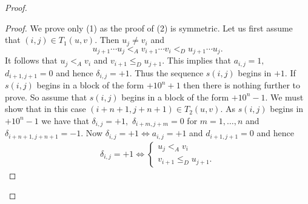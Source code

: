 \documentclass[12pt,a4paper]{amsart}
\begin{document}
\begin{proof}
\begin{proof} We prove only (1) as the proof of (2) is symmetric. Let us first assume that $(i,j)\in T_1(u,v).$ Then  $u_j\neq v_i$ and \begin{equation}\label{eq1}u_{j+1}\cdots u_j<_A v_{i+1}\cdots v_i <_D u_{j+1}\cdots u_j.\end{equation}
It follows that $u_j<_A v_i$ and $v_{i+1}\leq _D u_{j+1}.$ This implies that $a_{i,j}=1,$  $d_{i+1,j+1}=0 $ and hence $\delta_{i,j}=+1.$ Thus the  sequence $s(i,j)$ begins in $+1.$ If $s(i,j)$ begins in a block of the form $+10^n+1$ then there is nothing further to prove. So assume that $s(i,j)$ begins in a block of the form $+10^n-1.$ We must show that in this case $(i+n+1,j+n+1)\in T_2(u,v).$ As $s(i,j)$ begins in $+10^n-1$ we have that $\delta_{i,j}=+1,$ $\delta_{i+m,j+m}=0$ for $m=1,\ldots ,n$ and $\delta_{i+n+1,j+n+1}=-1.$  Now
$\delta_{i,j}=+1 \Leftrightarrow a_{i,j}=+1$ and $d_{i+1,j+1}=0$ and hence
\begin{align} \delta_{i,j}=+1 \Leftrightarrow \begin{cases}u_j<_A v_i\\v_{i+1}\leq_D u_{j+1}.\end{cases}\end{align}


\end{proof}
\end{proof}
\end{document}

